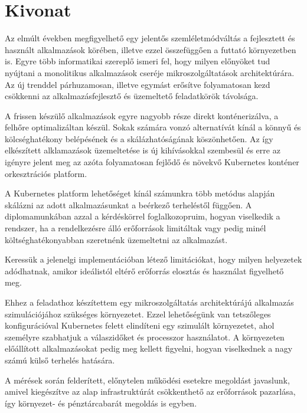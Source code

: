 \setcounter{page}{1}

\selecthungarian

\chapter*{Kivonat}

Az elmúlt években megfigyelhető egy jelentős szemléletmódváltás a fejlesztett és használt alkalmazások körében, illetve ezzel összefüggően a futtató környezetben is.
Egyre több informatikai szereplő ismeri fel, hogy milyen előnyöket tud nyújtani a monolitikus alkalmazások cseréje mikroszolgáltatások architektúrára.
Az új trenddel párhuzamosan, illetve egymást erősítve folyamatosan kezd csökkenni az alkalmazásfejlesztő és üzemeltető feladatkörök távolsága.

A frissen készülő alkalmazások egyre nagyobb része direkt konténerizálva, a felhőre optimalizáltan készül.
Sokak számára vonzó alternatívát kínál a könnyű és kölcséghatékony belépésének és a skálázhatóságának köszönhetően.
Az így elkészített alklamazások üzemeltetése is új kihívásokkal szembesül és erre az igényre jelent meg az azóta folyamatosan fejlődő és növekvő Kubernetes konténer orkesztrációs platform.

A Kubernetes platform lehetőséget kínál számunkra több metódus alapján skálázni az adott alkalmazásunkat a beérkező terheléstől függően.
A diplomamunkában azzal a kérdéskörrel foglalkozopruim, hogyan viselkedik a rendszer, ha a rendelkezésre álló erőforrások limitáltak vagy pedig minél költséghatékonyabban szeretnénk üzemeltetni az alkalmazást. 

Keressük a jelenelgi implementációban létező limitációkat, hogy milyen helyezetek adódhatnak, amikor ideálistól eltérő erőforrás elosztás és használat figyelhető meg.

Ehhez a feladathoz készítettem egy mikroszolgáltatás architektúrájú alkalmazás szimulációjához szükséges környezetet. Ezzel lehetőségünk van tetszőleges konfigurációval Kubernetes felett elindíteni egy szimulált környezetet, ahol személyre szabhatjuk a válaszidőket és processzor használatot.
A környezeten előállított alkalmazásokat pedig meg kellett figyelni, hogyan viselkednek a nagy számú külső terhelés hatására.

A mérések során felderített, előnytelen működési esetekre megoldást javaslunk, amivel kiegészítve az alap infrastruktúrát csökkenthető az erőforrások pazarlása, így környezet- és pénztárcabarát megoldás is egyben.

